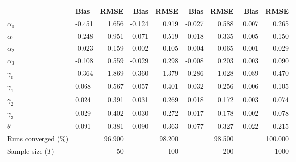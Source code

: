 
\begin{tabular}[t]{llrrrrrrr}
\toprule
  & Bias & RMSE & Bias & RMSE & Bias & RMSE & Bias & RMSE\\
\midrule
$\alpha_{0}$ & -0.451 & 1.656 & -0.124 & 0.919 & -0.027 & 0.588 & 0.007 & 0.265\\
$\alpha_{1}$ & -0.248 & 0.951 & -0.071 & 0.519 & -0.018 & 0.335 & 0.005 & 0.150\\
$\alpha_{2}$ & -0.023 & 0.159 & 0.002 & 0.105 & 0.004 & 0.065 & -0.001 & 0.029\\
$\alpha_{3}$ & -0.108 & 0.559 & -0.029 & 0.298 & -0.008 & 0.203 & 0.003 & 0.090\\
$\gamma_{0}$ & -0.364 & 1.869 & -0.360 & 1.379 & -0.286 & 1.028 & -0.089 & 0.470\\
$\gamma_{1}$ & 0.068 & 0.567 & 0.057 & 0.401 & 0.032 & 0.256 & 0.006 & 0.105\\
$\gamma_{2}$ & 0.024 & 0.391 & 0.031 & 0.269 & 0.018 & 0.172 & 0.003 & 0.074\\
$\gamma_{3}$ & 0.029 & 0.402 & 0.030 & 0.272 & 0.017 & 0.178 & 0.002 & 0.078\\
$\theta$ & 0.091 & 0.381 & 0.090 & 0.363 & 0.077 & 0.327 & 0.022 & 0.215\\
Runs converged (\%) &  & 96.900 &  & 98.200 &  & 98.500 &  & 100.000\\
Sample size ($T$) &  & 50 &  & 100 &  & 200 &  & 1000\\
\bottomrule
\end{tabular}

